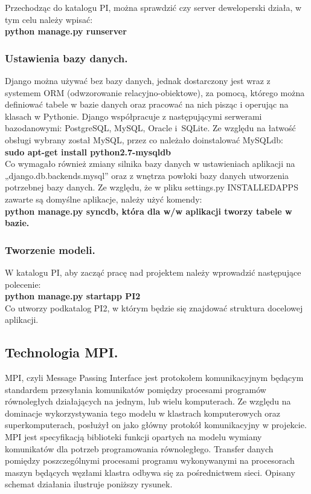 \documentclass[a4paper,12pt]{article}		%
\begin{document}
Przechodząc do katalogu PI, można sprawdzić czy server deweloperski działa, w tym celu należy wpisać:\\
\textbf{python manage.py runserver}

\subsubsection{Ustawienia bazy danych.}
Django można używać bez bazy danych, jednak dostarczony jest wraz z systemem ORM (odwzorowanie relacyjno-obiektowe), za pomocą, którego można definiować tabele w bazie danych oraz pracować na nich pisząc i operując na klasach w Pythonie. Django współpracuje z następującymi serwerami bazodanowymi: PostgreSQL, MySQL, Oracle i~SQLite. Ze względu na łatwość obsługi wybrany został MySQL, przez co należało doinstalować MySQLdb:\\
\textbf{sudo apt-get install python2.7-mysqldb}\\
Co wymagało również zmiany silnika bazy danych w ustawieniach aplikacji na „django.db.backends.mysql” oraz z wnętrza powłoki bazy danych utworzenia 
potrzebnej bazy danych. Ze względu, że w pliku settings.py INSTALLEDAPPS zawarte są domyślne aplikacje, należy użyć komendy:\\
\textbf{python manage.py syncdb, która dla w/w aplikacji tworzy tabele w bazie.}

\subsubsection{Tworzenie modeli.}
W katalogu PI, aby zacząć pracę nad projektem należy wprowadzić następujące polecenie:\\
\textbf{python manage.py startapp PI2}\\
Co utworzy podkatalog PI2, w którym będzie się znajdować struktura docelowej aplikacji.

\subsection{Technologia MPI.}
MPI, czyli Message Passing Interface jest protokołem komunikacyjnym będącym standardem przesyłania komunikatów pomiędzy procesami programów równoległych działających na jednym, lub wielu komputerach. Ze względu na dominacje wykorzystywania tego modelu w klastrach komputerowych oraz superkomputerach, posłużył on jako główny protokół komunikacyjny w projekcie.
MPI jest specyfikacją biblioteki funkcji opartych na modelu wymiany komunikatów dla potrzeb programowania równoległego. Transfer danych pomiędzy poszczególnymi procesami programu wykonywanymi na procesorach maszyn będących węzłami klastra odbywa się za pośrednictwem sieci. Opisany schemat działania ilustruje poniższy rysunek.
\end{document}
